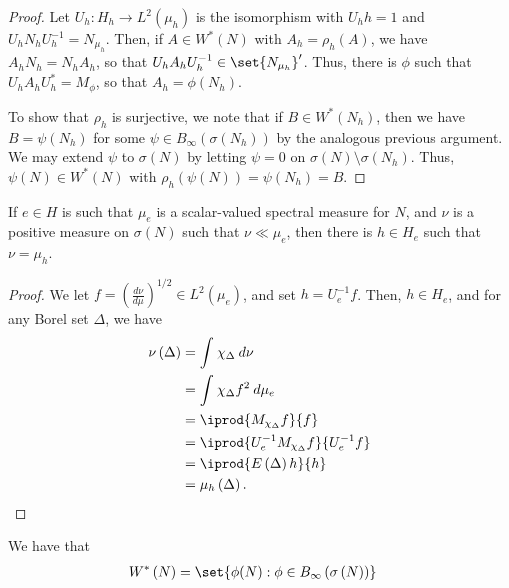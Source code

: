 \documentclass[10pt]{mypackage}
\begin{document}
\begin{proof}
  Let $U_h\colon H_h\to L^2\left( \mu_h \right)$ is the isomorphism with $U_hh = 1$ and $U_hN_hU_h^{-1} = N_{\mu_h}$. Then, if $A\in W^{\ast}\left( N \right)$ with $A_h = \rho_h\left( A \right)$, we have $A_hN_h = N_hA_h$, so that $U_hA_hU_h^{-1}\in \set{N_{\mu_h}}'$. Thus, there is $\phi$ such that $U_hA_hU_h^{\ast} = M_{\phi}$, so that $A_h = \phi\left( N_h \right)$.

  To show that $\rho_h$ is surjective, we note that if $B\in W^{\ast}\left( N_h \right)$, then we have $B = \psi\left( N_h \right)$ for some $\psi\in B_{\infty}\left( \sigma\left( N_h \right) \right)$ by the analogous previous argument. We may extend $\psi$ to $\sigma\left( N \right)$ by letting $\psi = 0$ on $\sigma\left( N \right)\setminus \sigma\left( N_h \right)$. Thus, $\psi\left( N \right)\in W^{\ast}\left( N \right)$ with $\rho_h\left( \psi\left( N \right) \right) = \psi\left( N_h \right) = B$.
\end{proof}
\begin{lemma}
  If $e\in H$ is such that $\mu_e$ is a scalar-valued spectral measure for $N$, and $\nu$ is a positive measure on $\sigma\left( N \right)$ such that $\nu\ll\mu_e$, then there is $h\in H_e$ such that $\nu = \mu_h$.
\end{lemma}
\begin{proof}
  We let $f = \left( \frac{d\nu}{d\mu} \right)^{1/2}\in L^2\left( \mu_e \right)$, and set $h = U_e^{-1}f$. Then, $h\in H_e$, and for any Borel set $\Delta$, we have
  \begin{align*}
    \nu\left( \Delta \right) &= \int_{}^{} \chi_{\Delta}\:d\nu\\
                             &= \int_{}^{} \chi_{\Delta}f^2\:d\mu_e\\
                             &= \iprod{M_{\chi_{\Delta}}f}{f}\\
                             &= \iprod{U_e^{-1}M_{\chi_{\Delta}}f}{U_e^{-1}f}\\
                             &= \iprod{E\left( \Delta \right)h}{h}\\
                             &= \mu_h\left( \Delta \right).
  \end{align*}
\end{proof}
\begin{lemma}
  We have that
  \begin{align*}
    W^{\ast}\left( N \right) &= \set{\phi(N) : \phi\in B_{\infty}\left( \sigma\left( N \right) \right)}
  \end{align*}
\end{lemma}
\end{document}

